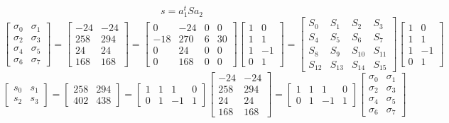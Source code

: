 \documentclass{article}%
\begin{document}
\[%
s = a_1^t S a_2%
\]%
\[%
\left[\begin{matrix}\sigma_{0} & \sigma_{1}\\\sigma_{2} & \sigma_{3}\\\sigma_{4} & \sigma_{5}\\\sigma_{6} & \sigma_{7}\end{matrix}\right] = \left[\begin{matrix}-24 & -24\\258 & 294\\24 & 24\\168 & 168\end{matrix}\right] = \left[\begin{matrix}0 & -24 & 0 & 0\\-18 & 270 & 6 & 30\\0 & 24 & 0 & 0\\0 & 168 & 0 & 0\end{matrix}\right] \left[\begin{matrix}1 & 0\\1 & 1\\1 & -1\\0 & 1\end{matrix}\right] = \left[\begin{matrix}S_{0} & S_{1} & S_{2} & S_{3}\\S_{4} & S_{5} & S_{6} & S_{7}\\S_{8} & S_{9} & S_{10} & S_{11}\\S_{12} & S_{13} & S_{14} & S_{15}\end{matrix}\right] \left[\begin{matrix}1 & 0\\1 & 1\\1 & -1\\0 & 1\end{matrix}\right]%
\]%
\[%
\left[\begin{matrix}s_{0} & s_{1}\\s_{2} & s_{3}\end{matrix}\right] = \left[\begin{matrix}258 & 294\\402 & 438\end{matrix}\right] = \left[\begin{matrix}1 & 1 & 1 & 0\\0 & 1 & -1 & 1\end{matrix}\right] \left[\begin{matrix}-24 & -24\\258 & 294\\24 & 24\\168 & 168\end{matrix}\right] = \left[\begin{matrix}1 & 1 & 1 & 0\\0 & 1 & -1 & 1\end{matrix}\right] \left[\begin{matrix}\sigma_{0} & \sigma_{1}\\\sigma_{2} & \sigma_{3}\\\sigma_{4} & \sigma_{5}\\\sigma_{6} & \sigma_{7}\end{matrix}\right]%
\]%
\end{document}
